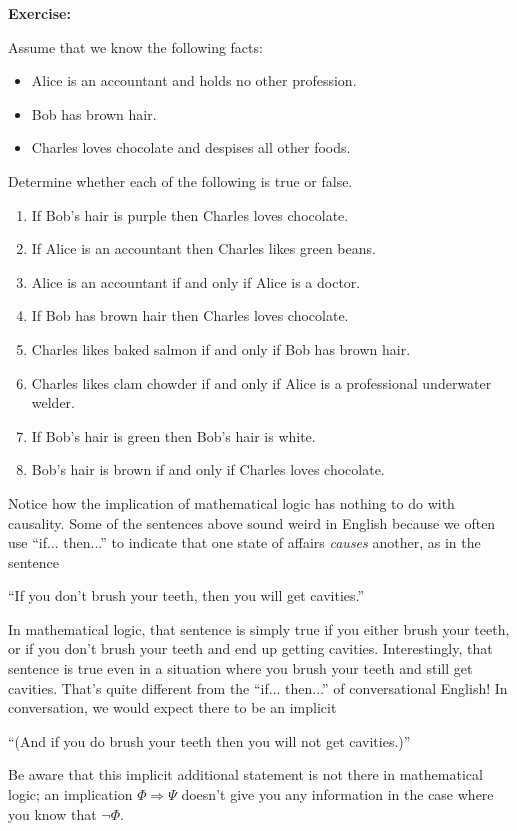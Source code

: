 \documentclass[12pt]{article}
\newcommand{\ARR}{\Rightarrow}
\newcommand{\ex}[1]{\textbf{Exercise:}\begin{adjustwidth}{2em}{}#1\end{adjustwidth}}
\def\pA{\Phi}
\def\pB{\Psi}
\begin{document}
\ex{
Assume that we know the following facts:
\begin{itemize}
\item Alice is an accountant and holds no other profession.
\item Bob has brown hair.
\item Charles loves chocolate and despises all other foods.
\end{itemize}
Determine whether each of the following is true or false.
\begin{enumerate}


\item %
If
Bob's hair is purple
then
Charles loves chocolate.


\item %
If
Alice is an accountant
then
Charles likes green beans.


\item %
Alice is an accountant
if and only if
Alice is a doctor.


\item %
If
Bob has brown hair
then
Charles loves chocolate.


\item %
Charles likes baked salmon
if and only if
Bob has brown hair.


\item %
Charles likes clam chowder
if and only if
Alice is a professional underwater welder.

\item %
If
Bob's hair is green
then
Bob's hair is white.

\item %
Bob's hair is brown
if and only if
Charles loves chocolate.


\end{enumerate}

Notice how the implication of mathematical logic has nothing to do with causality.
Some of the sentences above sound weird in English because we often use ``if... then...'' to 
indicate that one state of affairs \emph{causes} another, as in the sentence
\begin{center}``If you don't brush your teeth, then you will get cavities.''\end{center}
In mathematical logic, that sentence is simply true if you either brush your teeth, or if you don't brush your teeth and end up getting cavities.
Interestingly, that sentence is true even in a situation where you brush your teeth and still get cavities.
That's quite different from the ``if... then...'' of conversational English!
In conversation, we would expect there to be an implicit
\begin{center}``(And if you do brush your teeth then you will not get cavities.)''\end{center}
Be aware that this implicit additional statement is not there in mathematical logic; 
an implication $\pA\ARR\pB$ doesn't give you any information in the case where you know that $\neg\pA$.
}
\end{document}

